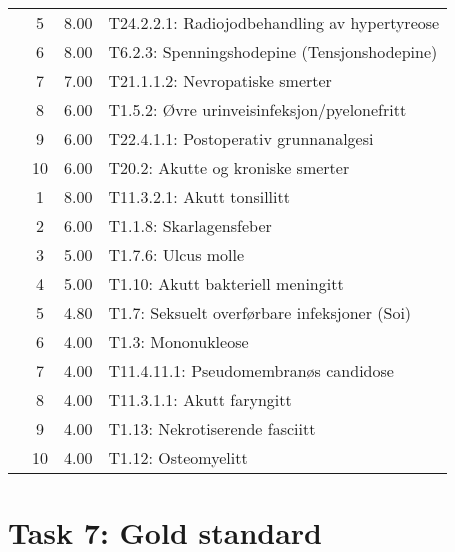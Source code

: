 \begin{table}[htbp]
\begin{tabular}{c c c l}
     & 5 & 8.00 & T24.2.2.1: Radiojodbehandling av hypertyreose \\
     & 6 & 8.00 & T6.2.3: Spenningshodepine (Tensjonshodepine) \\
     & 7 & 7.00 & T21.1.1.2: Nevropatiske smerter \\
     & 8 & 6.00 & T1.5.2: Øvre urinveisinfeksjon/pyelonefritt \\
     & 9 & 6.00 & T22.4.1.1: Postoperativ grunnanalgesi \\
     & 10 & 6.00 & T20.2: Akutte og kroniske smerter \\
	\addlinespace
    8 & 1 & 8.00 & T11.3.2.1: Akutt tonsillitt \\
     & 2 & 6.00 & T1.1.8: Skarlagensfeber \\
     & 3 & 5.00 & T1.7.6: Ulcus molle \\
     & 4 & 5.00 & T1.10: Akutt bakteriell meningitt \\
     & 5 & 4.80 & T1.7: Seksuelt overførbare infeksjoner (Soi) \\
     & 6 & 4.00 & T1.3: Mononukleose \\
     & 7 & 4.00 & T11.4.11.1: Pseudomembranøs candidose \\
     & 8 & 4.00 & T11.3.1.1: Akutt faryngitt \\
     & 9 & 4.00 & T1.13: Nekrotiserende fasciitt \\
     & 10 & 4.00 & T1.12: Osteomyelitt \\
	\bottomrule
\end{tabular}
\end{table}


\section{Task 7: Gold standard}


